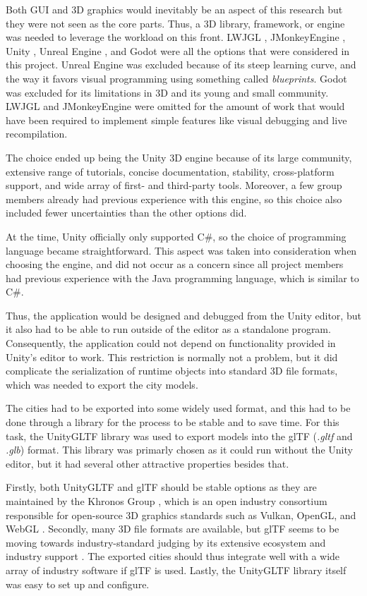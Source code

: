Both GUI and 3D graphics would inevitably be an aspect of this research but they were not seen as the core parts.
Thus, a 3D library, framework, or engine was needed to leverage the workload on this front.
LWJGL \cite{lwjgl}, JMonkeyEngine \cite{jmonkey}, Unity \cite{unity}, Unreal Engine \cite{unreal}, and Godot \cite{godot} were all the options that were considered in this project.
Unreal Engine was excluded because of its steep learning curve, and the way it favors visual programming using something called \textit{blueprints}.
Godot was excluded for its limitations in 3D and its young and small community.
LWJGL and JMonkeyEngine were omitted for the amount of work that would have been required to implement simple features like visual debugging and live recompilation.

The choice ended up being the Unity 3D engine because of its large community, extensive range of tutorials, concise documentation, stability, cross-platform support, and wide array of first- and third-party tools.
Moreover, a few group members already had previous experience with this engine, so this choice also included fewer uncertainties than the other options did.

At the time, Unity officially only supported C\#, so the choice of programming language became straightforward.
This aspect was taken into consideration when choosing the engine, and did not occur as a concern since all project members had previous experience with the Java programming language, which is similar to C\#.

Thus, the application would be designed and debugged from the Unity editor, but it also had to be able to run outside of the editor as a standalone program.
Consequently, the application could not depend on functionality provided in Unity's editor to work.
This restriction is normally not a problem, but it did complicate the serialization of runtime objects into standard 3D file formats, which was needed to export the city models.

The cities had to be exported into some widely used format, and this had to be done through a library for the process to be stable and to save time.
For this task, the UnityGLTF \cite{unity_gltf} library was used to export models into the glTF (\textit{.gltf} and \textit{.glb}) \cite{gltf} format.
This library was primarly chosen as it could run without the Unity editor, but it had several other attractive properties besides that.

Firstly, both UnityGLTF and glTF should be stable options as they are maintained by the Khronos Group \cite{unity_gltf} \cite{gltf}, which is an open industry consortium responsible for open-source 3D graphics standards such as Vulkan, OpenGL, and WebGL \cite{khronos_about}.
Secondly, many 3D file formats are available, but glTF seems to be moving towards industry-standard judging by its extensive ecosystem and industry support \cite{gltf}.
The exported cities should thus integrate well with a wide array of industry software if glTF is used.
Lastly, the UnityGLTF library itself was easy to set up and configure.

